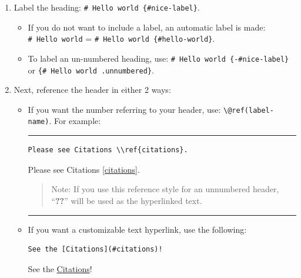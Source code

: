 \documentclass[
]{book}
\providecommand{\tightlist}{%
  \setlength{\itemsep}{0pt}\setlength{\parskip}{0pt}}
\theoremstyle{definition}
\theoremstyle{definition}
\theoremstyle{definition}
\theoremstyle{definition}
\theoremstyle{remark}
\begin{document}
\begin{enumerate}
\def\labelenumi{\arabic{enumi}.}
\tightlist
\item
  Label the heading: \texttt{\#\ Hello\ world\ \{\#nice-label\}}.

  \begin{itemize}
  \tightlist
  \item
    If you do not want to include a label, an automatic label is made: \texttt{\#\ Hello\ world} = \texttt{\#\ Hello\ world\ \{\#hello-world\}}.
  \item
    To label an un-numbered heading, use: \texttt{\#\ Hello\ world\ \{-\#nice-label\}} or \texttt{\{\#\ Hello\ world\ .unnumbered\}}.
  \end{itemize}
\item
  Next, reference the header in either 2 ways:

  \begin{itemize}
  \item
    If you want the number referring to your header, use: \texttt{\textbackslash{}@ref(label-name)}. For example:

    \begin{center}\rule{0.5\linewidth}{0.5pt}\end{center}

\begin{verbatim}
Please see Citations \\ref{citations}.
\end{verbatim}

    Please see Citations \ref{citations}.

    \begin{quote}
    Note: If you use this reference style for an unnumbered header, ``\textbf{??}'' will be used as the hyperlinked text.
    \end{quote}

    \begin{center}\rule{0.5\linewidth}{0.5pt}\end{center}
  \item
    If you want a customizable text hyperlink, use the following:

\begin{verbatim}
See the [Citations](#citations)!
\end{verbatim}

    See the \hyperref[citations]{Citations}!
  \end{itemize}
\end{enumerate}
\end{document}
